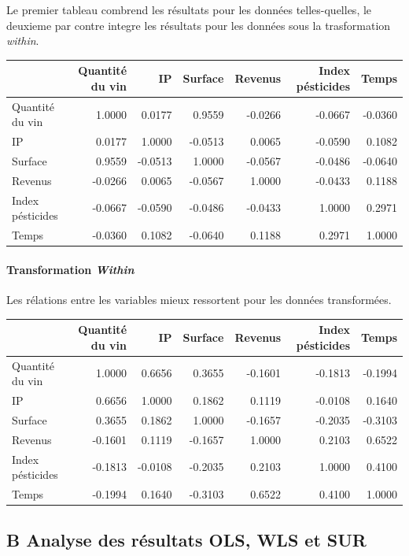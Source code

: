 \documentclass[11pt,]{article}
\let\oldparagraph\paragraph
\renewcommand{\paragraph}[1]{\oldparagraph{#1}\mbox{}}
\begin{document}
Le premier tableau combrend les résultats pour les données
telles-quelles, le deuxieme par contre integre les résultats pour les
données sous la trasformation \emph{within}.

\FloatBarrier

\begin{longtable}[]{@{}lrrrrrr@{}}
\toprule
& Quantité du vin & IP & Surface & Revenus & Index pésticides &
Temps\tabularnewline
\midrule
\endhead
Quantité du vin & 1.0000 & 0.0177 & 0.9559 & -0.0266 & -0.0667 &
-0.0360\tabularnewline
IP & 0.0177 & 1.0000 & -0.0513 & 0.0065 & -0.0590 &
0.1082\tabularnewline
Surface & 0.9559 & -0.0513 & 1.0000 & -0.0567 & -0.0486 &
-0.0640\tabularnewline
Revenus & -0.0266 & 0.0065 & -0.0567 & 1.0000 & -0.0433 &
0.1188\tabularnewline
Index pésticides & -0.0667 & -0.0590 & -0.0486 & -0.0433 & 1.0000 &
0.2971\tabularnewline
Temps & -0.0360 & 0.1082 & -0.0640 & 0.1188 & 0.2971 &
1.0000\tabularnewline
\bottomrule
\end{longtable}

\FloatBarrier

\hypertarget{transformation-within-1}{%
\paragraph{\texorpdfstring{Transformation
\emph{Within}}{Transformation Within}}\label{transformation-within-1}}

Les rélations entre les variables mieux ressortent pour les données
transformées.

\FloatBarrier

\begin{longtable}[]{@{}lrrrrrr@{}}
\toprule
& Quantité du vin & IP & Surface & Revenus & Index pésticides &
Temps\tabularnewline
\midrule
\endhead
Quantité du vin & 1.0000 & 0.6656 & 0.3655 & -0.1601 & -0.1813 &
-0.1994\tabularnewline
IP & 0.6656 & 1.0000 & 0.1862 & 0.1119 & -0.0108 & 0.1640\tabularnewline
Surface & 0.3655 & 0.1862 & 1.0000 & -0.1657 & -0.2035 &
-0.3103\tabularnewline
Revenus & -0.1601 & 0.1119 & -0.1657 & 1.0000 & 0.2103 &
0.6522\tabularnewline
Index pésticides & -0.1813 & -0.0108 & -0.2035 & 0.2103 & 1.0000 &
0.4100\tabularnewline
Temps & -0.1994 & 0.1640 & -0.3103 & 0.6522 & 0.4100 &
1.0000\tabularnewline
\bottomrule
\end{longtable}

\FloatBarrier

\newpage

\hypertarget{b-analyse-des-resultats-ols-wls-et-sur}{%
\subsection{B Analyse des résultats OLS, WLS et
SUR}\label{b-analyse-des-resultats-ols-wls-et-sur}}
\end{document}
